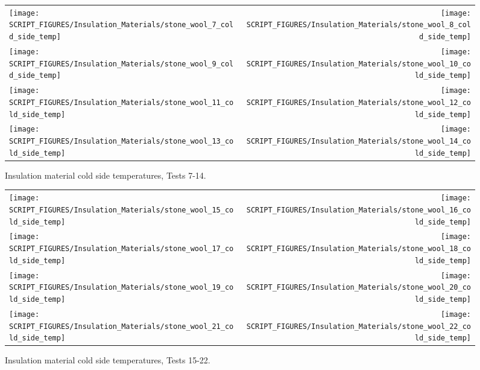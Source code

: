 \begin{figure}[p]
	\begin{tabular*}{\textwidth}{l@{\extracolsep{\fill}}r}
		\texttt{[image: SCRIPT\_FIGURES/Insulation\_Materials/stone\_wool\_7\_cold\_side\_temp]} &
		\texttt{[image: SCRIPT\_FIGURES/Insulation\_Materials/stone\_wool\_8\_cold\_side\_temp]} \\
		\texttt{[image: SCRIPT\_FIGURES/Insulation\_Materials/stone\_wool\_9\_cold\_side\_temp]} &
		\texttt{[image: SCRIPT\_FIGURES/Insulation\_Materials/stone\_wool\_10\_cold\_side\_temp]} \\
		\texttt{[image: SCRIPT\_FIGURES/Insulation\_Materials/stone\_wool\_11\_cold\_side\_temp]} &
		\texttt{[image: SCRIPT\_FIGURES/Insulation\_Materials/stone\_wool\_12\_cold\_side\_temp]} \\
		\texttt{[image: SCRIPT\_FIGURES/Insulation\_Materials/stone\_wool\_13\_cold\_side\_temp]} &
		\texttt{[image: SCRIPT\_FIGURES/Insulation\_Materials/stone\_wool\_14\_cold\_side\_temp]}
	\end{tabular*}
    \caption[Insulation material cold side temperatures, Tests 7-14]{Insulation material cold side temperatures, Tests 7-14.}
    \label{wool_2}
\end{figure}

\begin{figure}[p]
	\begin{tabular*}{\textwidth}{l@{\extracolsep{\fill}}r}
		\texttt{[image: SCRIPT\_FIGURES/Insulation\_Materials/stone\_wool\_15\_cold\_side\_temp]} &
		\texttt{[image: SCRIPT\_FIGURES/Insulation\_Materials/stone\_wool\_16\_cold\_side\_temp]} \\
		\texttt{[image: SCRIPT\_FIGURES/Insulation\_Materials/stone\_wool\_17\_cold\_side\_temp]} &
		\texttt{[image: SCRIPT\_FIGURES/Insulation\_Materials/stone\_wool\_18\_cold\_side\_temp]} \\
		\texttt{[image: SCRIPT\_FIGURES/Insulation\_Materials/stone\_wool\_19\_cold\_side\_temp]} &
		\texttt{[image: SCRIPT\_FIGURES/Insulation\_Materials/stone\_wool\_20\_cold\_side\_temp]} \\
		\texttt{[image: SCRIPT\_FIGURES/Insulation\_Materials/stone\_wool\_21\_cold\_side\_temp]} &
		\texttt{[image: SCRIPT\_FIGURES/Insulation\_Materials/stone\_wool\_22\_cold\_side\_temp]}
	\end{tabular*}
    \caption[Insulation material cold side temperatures, Tests 15-22]{Insulation material cold side temperatures, Tests 15-22.}
    \label{wool_3}
\end{figure}

